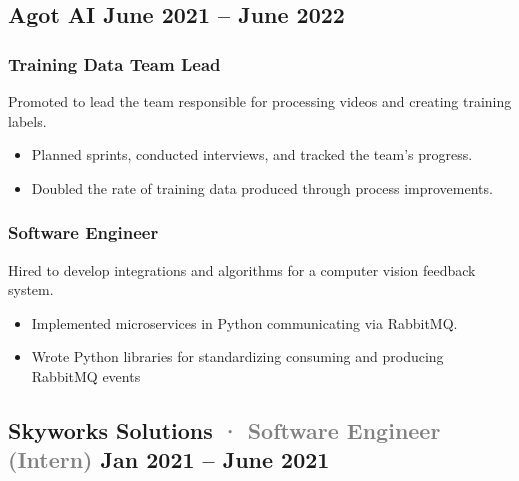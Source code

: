 \documentclass[10pt]{article} %
\providecommand{\tightlist}{%
  \setlength{\itemsep}{0pt}\setlength{\parskip}{0pt}}
\renewcommand{\emph}[1]{%
  \textcolor{gray}{#1}%
}
\begin{document}
\begin{paracol}{2}
\hypertarget{agot-ai-june-2021-june-2022}{%
\subsection{\texorpdfstring{Agot AI \hfill \small June 2021 -- June
2022}{Agot AI June 2021 -- June 2022}}\label{agot-ai-june-2021-june-2022}}

\vspace{-5pt}

\hypertarget{training-data-team-lead}{%
\subsubsection{\texorpdfstring{\small Training Data Team
Lead}{Training Data Team Lead}}\label{training-data-team-lead}}

Promoted to lead the team responsible for processing videos and creating
training labels.

\begin{itemize}
\tightlist
\item
  Planned sprints, conducted interviews, and tracked the team's
  progress.
\item
  Doubled the rate of training data produced through process
  improvements.
\end{itemize}

\hypertarget{software-engineer}{%
\subsubsection{\texorpdfstring{\small Software
Engineer}{Software Engineer}}\label{software-engineer}}

Hired to develop integrations and algorithms for a computer vision
feedback system.

\begin{itemize}
\tightlist
\item
  Implemented microservices in Python communicating via RabbitMQ.
\item
  Wrote Python libraries for standardizing consuming and producing
  RabbitMQ events
\end{itemize}

\hypertarget{skyworks-solutions-software-engineer-intern-jan-2021-june-2021}{%
\subsection{\texorpdfstring{Skyworks Solutions \emph{· \small Software
Engineer (Intern)} \hfill \small Jan 2021 -- June
2021}{Skyworks Solutions · Software Engineer (Intern) Jan 2021 -- June 2021}}\label{skyworks-solutions-software-engineer-intern-jan-2021-june-2021}}


\end{paracol}
\end{document}
